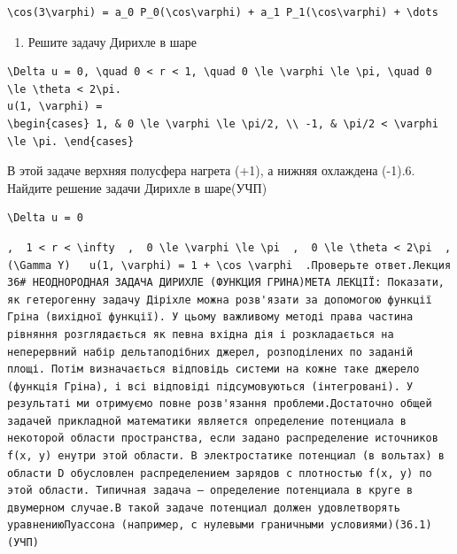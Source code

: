 \documentclass[
  ukrainian,
]{article}
\providecommand{\tightlist}{%
  \setlength{\itemsep}{0pt}\setlength{\parskip}{0pt}}
\begin{document}
\begin{verbatim}
\cos(3\varphi) = a_0 P_0(\cos\varphi) + a_1 P_1(\cos\varphi) + \dots
\end{verbatim}

\begin{enumerate}
\def\labelenumi{\arabic{enumi}.}
\setcounter{enumi}{4}
\tightlist
\item
  Решите задачу Дирихле в шаре
\end{enumerate}

\begin{verbatim}
\Delta u = 0, \quad 0 < r < 1, \quad 0 \le \varphi \le \pi, \quad 0 \le \theta < 2\pi.
u(1, \varphi) =
\begin{cases} 1, & 0 \le \varphi \le \pi/2, \\ -1, & \pi/2 < \varphi \le \pi. \end{cases}
\end{verbatim}

В этой задаче верхняя полусфера нагрета (+1), а нижняя охлаждена (-1).6.
Найдите решение задачи Дирихле в шаре(УЧП)

\begin{verbatim}
\Delta u = 0
\end{verbatim}

\begin{verbatim}
,  1 < r < \infty  ,  0 \le \varphi \le \pi  ,  0 \le \theta < 2\pi  ,  (\Gamma Y)   u(1, \varphi) = 1 + \cos \varphi  .Проверьте ответ.Лекция 36# НЕОДНОРОДНАЯ ЗАДАЧА ДИРИХЛЕ (ФУНКЦИЯ ГРИНА)МЕТА ЛЕКЦІЇ: Показати, як гетерогенну задачу Діріхле можна розв'язати за допомогою функції Гріна (вихідної функції). У цьому важливому методі права частина рівняння розглядається як певна вхідна дія і розкладається на неперервний набір дельтаподібних джерел, розподілених по заданій площі. Потім визначається відповідь системи на кожне таке джерело (функція Гріна), і всі відповіді підсумовуються (інтегровані). У результаті ми отримуємо повне розв'язання проблеми.Достаточно общей задачей прикладной математики является определение потенциала в некоторой области пространства, если задано распределение источников f(x, y) енутри этой области. В электростатике потенциал (в вольтах) в области D обусловлен распределением зарядов с плотностью f(x, y) по этой области. Типичная задача — определение потенциала в круге в двумерном случае.В такой задаче потенциал должен удовлетворять уравнениюПуассона (например, с нулевыми граничными условиями)(36.1) (УЧП)
\end{verbatim}
\end{document}
